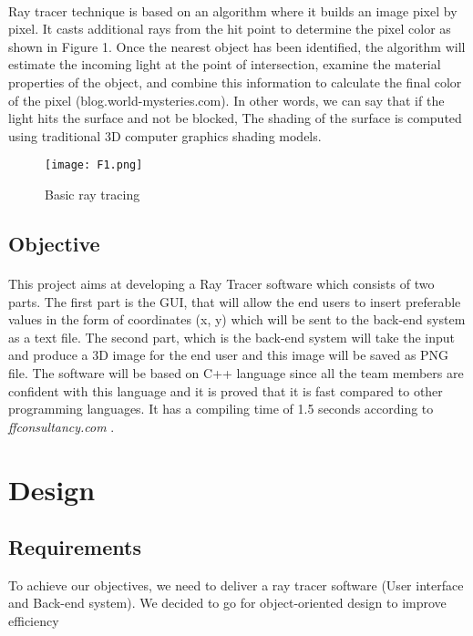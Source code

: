 \documentclass{article}
\begin{document}
\paragraph{}
Ray tracer technique is based on an algorithm where it builds an image pixel by pixel. It casts additional rays from the hit point to determine the pixel color as shown in Figure 1.
Once the nearest object has been identified, the algorithm will estimate the incoming light at the point of intersection, examine the material properties of the object, and combine this information to calculate the final color of the pixel (blog.world-mysteries.com). In other words, we can say that if the light hits the surface and not be blocked,  The shading of the surface is computed using traditional 3D computer graphics shading models. 

\begin{figure}
    \centering
    \texttt{[image: F1.png]}
    \caption{Basic ray tracing}
    \label{figure1}
\end{figure}

\subsection{Objective}

\paragraph{}
This project aims at developing a Ray Tracer software which consists of two parts. The first part is the GUI, that will allow the end users to insert preferable values in the form of coordinates (x, y) which will be sent to the back-end system as a text file.
The second part, which is the back-end system will take the input and produce a 3D image for the end user and this image will be saved as PNG file. 
The software will be based on C++ language since all the team members are confident with this language and it is proved that it is fast compared to other programming languages. It has a compiling time of 1.5 seconds according to \textit{ffconsultancy.com }.


\section{Design}

\subsection{Requirements}
To achieve our objectives, we need to deliver a ray tracer software (User interface and Back-end system).  
We decided to go for object-oriented design to improve efficiency 
\end{document}
